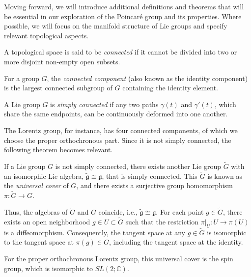 Moving forward, we will introduce additional definitions and theorems that will be essential in our exploration of the Poincaré group and its properties. Where possible, we will focus on the manifold structure of Lie groups and specify relevant topological aspects.

\begin{definition}
A topological space is said to be \emph{connected} if it cannot be divided into two or more disjoint non-empty open subsets.
\end{definition}

\begin{definition}
For a group $G$, the \emph{connected component} (also known as the identity component) is the largest connected subgroup of $G$ containing the identity element.
\end{definition}

\begin{definition}
A Lie group $G$ is \emph{simply connected} if any two paths $\gamma(t)$ and $\gamma'(t)$, which share the same endpoints, can be continuously deformed into one another.
\end{definition}

\noindent
The Lorentz group, for instance, has four connected components, of which we choose the proper orthochronous part. Since it is not simply connected, the following theorem becomes relevant.

\begin{theorem}
If a Lie group $G$ is not simply connected, there exists another Lie group $\tilde{G}$ with an isomorphic Lie algebra, $\tilde{\mathfrak{g}} \cong \mathfrak{g}$, that is simply connected. This $\tilde{G}$ is known as the \emph{universal cover} of $G$, and there exists a surjective group homomorphism $\pi : \tilde{G} \to G$.
\end{theorem}

Thus, the algebras of $\tilde{G}$ and $G$ coincide, i.e., $\tilde{\mathfrak{g}} \cong \mathfrak{g}$. For each point $g \in \tilde{G}$, there exists an open neighborhood $g \in U \subset \tilde{G}$ such that the restriction $\pi|_U : U \to \pi(U)$ is a diffeomorphism. Consequently, the tangent space at any $g \in \tilde{G}$ is isomorphic to the tangent space at $\pi(g) \in G$, including the tangent space at the identity.

For the proper orthochronous Lorentz group, this universal cover is the spin group, which is isomorphic to $SL(2; \mathbb{C})$.


